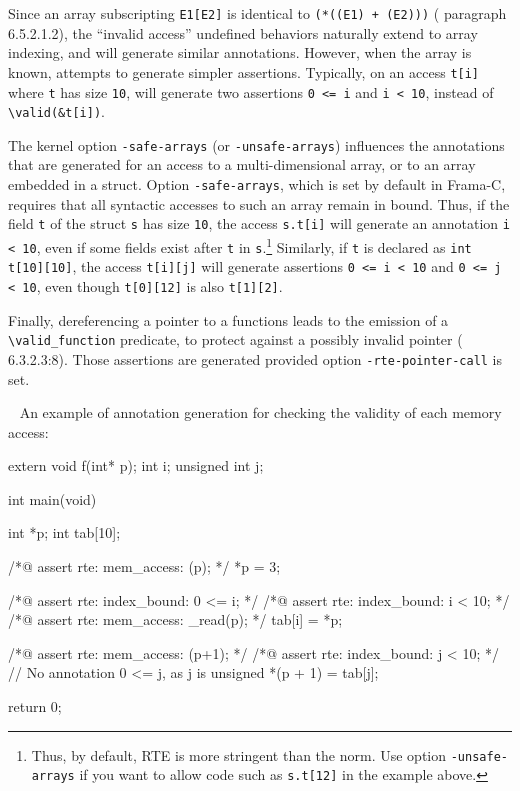 Since an array subscripting \lstinline|E1[E2]| is identical to
\lstinline|(*((E1) + (E2)))| (\cnn{} paragraph \mbox{6.5.2.1.2}), the ``invalid
access'' undefined behaviors naturally extend to array indexing, and \rte{} will
generate similar annotations.  However, when the array is known, \rte{} attempts
to generate simpler assertions.  Typically, on an access \lstinline|t[i]| where
\lstinline|t| has size \lstinline|10|, \rte{} will generate two assertions
\lstinline|0 <= i| and \lstinline|i < 10|, instead of \lstinline|\valid(&t[i])|.

The kernel option \lstinline|-safe-arrays| (or \lstinline|-unsafe-arrays|)
influences the annotations that are generated for an access to a
multi-dimensional array, or to an array embedded in a struct.  Option
\lstinline|-safe-arrays|, which is set by default in Frama-C, requires that all
syntactic accesses to such an array remain in bound. Thus, if the field
\lstinline|t| of the struct \lstinline|s| has size \lstinline|10|, the access
\lstinline|s.t[i]| will generate an annotation \lstinline|i < 10|, even if some
fields exist after \lstinline|t| in \lstinline|s|.\footnote{ Thus, by default,
  RTE is more stringent than the norm. Use option \lstinline|-unsafe-arrays| if
  you want to allow code such as \lstinline|s.t[12]| in the example above.}
Similarly, if \lstinline|t| is declared as \lstinline|int t[10][10]|, the access
\lstinline|t[i][j]| will generate assertions \lstinline|0 <= i < 10| and
\lstinline|0 <= j < 10|, even though \lstinline|t[0][12]| is also
\lstinline|t[1][2]|.

Finally, dereferencing a pointer to a functions leads to the emission of
a \lstinline|\valid_function| predicate, to protect against a possibly
invalid pointer (\cnn{} 6.3.2.3:8). Those assertions are generated provided
option \lstinline|-rte-pointer-call| is set.



\begin{example} ~
An example of \rte{} annotation generation for checking the validity of each
memory access:
\begin{listing-nonumber}
extern void f(int* p);
int i;
unsigned int j;

int main(void) {
  int *p;
  int tab[10];

  /*@ assert rte: mem_access: \valid(p); */
  *p = 3;

  /*@ assert rte: index_bound: 0 <= i; */
  /*@ assert rte: index_bound: i < 10; */
  /*@ assert rte: mem_access: \valid_read(p); */
  tab[i] = *p;

  /*@ assert rte: mem_access: \valid(p+1); */
  /*@ assert rte: index_bound: j < 10; */
  // No annotation 0 <= j, as j is unsigned
  *(p + 1) = tab[j];

  return 0;
}
\end{listing-nonumber}


\end{example}

